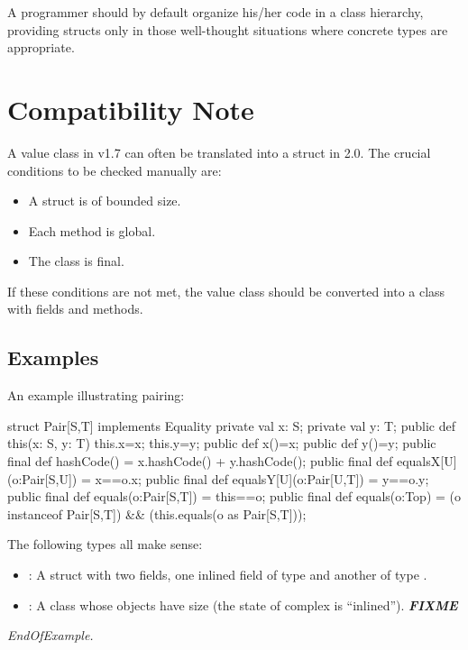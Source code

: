 A programmer should by default organize his/her code in a class
 hierarchy, providing structs only in those well-thought situations
 where concrete types are appropriate.

\section{Compatibility Note}

A value class in \Xten{} v1.7 can often be translated into a struct in \Xten{} 2.0. The crucial conditions to be checked manually are: \begin{itemize}
\item  A struct is of bounded size. 
\item  Each method is global. 
\item  The class is final.
\end{itemize}
 

If these conditions are not met, the value class should be converted
into a class with  fields and methods.

\subsection{Examples}

An example illustrating pairing:
\begin{xten}
struct Pair[S,T] implements Equality {
  private val x: S;
  private val y: T;
  public def this(x: S, y: T) {
    this.x=x;
    this.y=y;
  }
  public def x()=x;
  public def y()=y;  
  public final def hashCode() = x.hashCode() + y.hashCode();
  public final def equalsX[U](o:Pair[S,U]) = x==o.x;
  public final def equalsY[U](o:Pair[U,T]) = y==o.y;
  public final def equals(o:Pair[S,T]) = this==o;
  public final def equals(o:Top) = 
     (o instanceof Pair[S,T]) && (this.equals(o as Pair[S,T]));
}
\end{xten}

The following types all make sense: 
\begin{itemize}
\item {}: A struct with two fields, one inlined field of type  and another of type . 
\item {}: A class whose objects have size
   (the state of complex is
  ``inlined''). \emph\bf{FIXME}
\end{itemize}
\emph{EndOfExample.}

